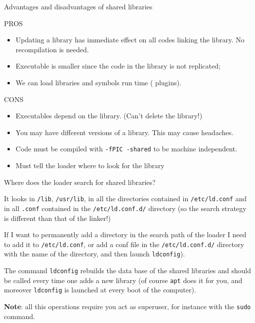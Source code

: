 \documentclass[12pt,aspectratio=169]{beamer}
\begin{document}
\begin{frame}{Advantages and disadvantages of shared libraries}
  \begin{center}
  \alert{PROS}
  \end{center}
  \begin{itemize}
  \item Updating a library has immediate effect on all codes linking the
    library. {\color{blue} No recompilation is needed.}
  \item Executable is smaller since the code in the library is not replicated;
  \item {\color{blue} We can load libraries and symbols run time ({\color{blue} plugins}).}
  \end{itemize}
  \begin{center}
  \alert{CONS}
  \end{center}
  \begin{itemize}
  \item Executables depend on the library. (Can't delete the library!)
  \item You may have different versions of a library. This may cause headaches.
  \item Code must be compiled with \texttt{-fPIC -shared} to be machine independent.
  \item Must tell the loader where to look for the library
  \end{itemize}
  \end{frame}


  \begin{frame}{Where does the loader search for shared libraries?}  

    It looks in \texttt{/lib}, \texttt{/usr/lib}, in all the
    directories contained in \texttt{/etc/ld.conf} and in all \texttt{.conf} contained in the \texttt{/etc/ld.conf.d/}
    directory (so the search strategy is different than that of the
    linker!) \smallskip
  
    If I want to permanently add a directory in the search path of the
    loader I need to add it to \texttt{/etc/ld.conf}, or add a conf file
    in the \texttt{/etc/ld.conf.d/} directory with the name of the
    directory, and then launch \texttt{ldconfig}).  \smallskip
  
    The command \texttt{ldconfig} rebuilds the data base of the shared
    libraries and should be called every time one adds a new library (of
    course \texttt{apt} does it for you, and moreover
    \texttt{ldconfig} is launched at every boot of the computer).
    \smallskip
  
    \textbf{Note}: all this operations require you act as superuser, for
    instance with the \texttt{sudo} command.
  \end{frame}
  
\end{document}
